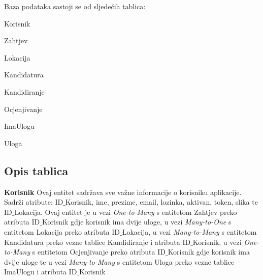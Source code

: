 		Baza podataka sastoji se od sljedećih tablica:
		
		\begin{packed_item}
			\item Korisnik
			\item Zahtjev
			\item Lokacija
			\item Kandidatura
			\item Kandidiranje
			\item Ocjenjivanje
			\item ImaUlogu 
			\item Uloga
			
		\end{packed_item}
		
			\subsection{Opis tablica}
			
					    \textbf{ Korisnik}
		    \text Ovaj entitet sadržava sve važne informacije o korisniku aplikacije. Sadrži atribute: ID${\_}$Korisnik, ime, prezime, email, lozinka, aktivan, token, slika te ID${\_}$Lokacija. Ovaj entitet je u vezi \emph{One-to-Many} s entitetom Zahtjev preko atributa ID${\_}$Korisnik gdje korisnik ima dvije uloge, u vezi  \emph{Many-to-One} s entitetom Lokacija preko atributa ID${\_}$Lokacija, u vezi \emph{Many-to-Many} s entitetom Kandidatura preko vezne tablice Kandidiranje i atributa ID${\_}$Korisnik, u vezi \emph{One-to-Many} s entitetom Ocjenjivanje preko atributa ID${\_}$Korisnik gdje korisnik ima dvije uloge te u vezi \emph{Many-to-Many} s entitetom Uloga preko vezne tablice ImaUlogu i atributa ID${\_}$Korisnik
				
